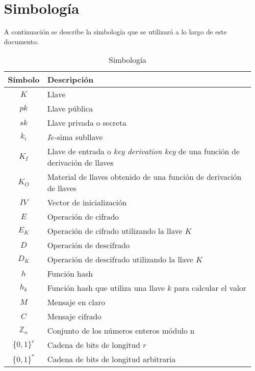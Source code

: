 %
%

\section*{Simbología}

A continuación se describe la simbología que se utilizará a lo largo de
este documento.

\begin{table}[H]
  \caption{Simbología}\label{tab:simb}
  \begin{center}
    \begin{tabular}{c|l}
      Símbolo & Descripción \\
      \hline
      $K$ & Llave \\
      \hline
      $pk$ & Llave pública \\
      \hline
      $sk$ & Llave privada o secreta \\
      \hline
      $k_i$ & $I\acute{e}$-sima subllave \\
      \hline
      $K_I$ & Llave de entrada o \textit{key derivation key} de una función 
      de derivación de llaves \\
      \hline
      $K_O$ & Material de llaves obtenido de una función de derivación de llaves \\
      \hline
      $IV$ & Vector de inicialización \\
      \hline
      $E$ & Operación de cifrado \\
      \hline
      $E_K$ & Operación de cifrado utilizando la llave $K$ \\
      \hline
      $D$ & Operación de descifrado \\
      \hline
      $D_K$ & Operación de descifrado utilizando la llave $K$ \\
      \hline
      $h$ & Función hash \\
      \hline
      $h_k$ & Función hash que utiliza una llave $k$ para calcular el valor\\
      \hline
      $M$ & Mensaje en claro\\
      \hline
      $C$ & Mensaje cifrado\\
      \hline
      $\mathbb{Z}_n$ & Conjunto de los números enteros módulo n\\
      \hline
      $\{0,1\}^r$ & Cadena de bits de longitud $r$ \\
      \hline
      $\{0,1\}^*$ & Cadena de bits de longitud arbitraria \\

\end{tabular}
\end{center}
\end{table}
